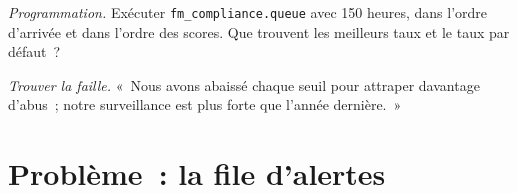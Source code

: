 \begin{exercise}[$\star\star\star$]\label{exo:fm:compliance-and-market-abuse:7}
\emph{Programmation.} Exécuter \texttt{fm\_compliance.queue} avec 150 heures, dans l'ordre d'arrivée et dans l'ordre des scores. Que trouvent les meilleurs taux et le taux
par défaut~?
\end{exercise}

\begin{exercise}[$\star\star\star$]\label{exo:fm:compliance-and-market-abuse:8}
\emph{Trouver la faille.} «~Nous avons abaissé chaque seuil pour attraper davantage d'abus~; notre surveillance est plus forte que l'année dernière.~»
\end{exercise}

\section{Problème~: la file d'alertes}

